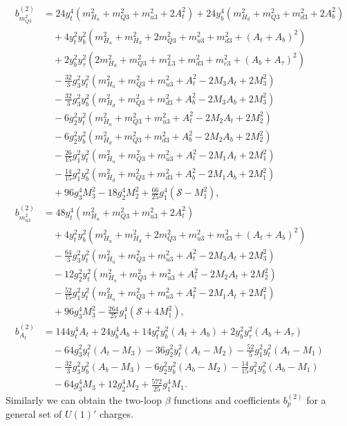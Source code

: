 \documentclass[preprint,amsmath,amssymb,aps,superscriptaddress,prd,showpacs,floatfix,nofootinbib]{revtex4-1}
\begin{document}
\begin{subequations}\label{eq:MSSMsEffPotCoeffs}
\begin{align}
b_{m_{Q3}^2}^{(2)}&=24y_t^4\left ( m_{H_u}^2+m_{Q3}^2+m_{u3}^2+2A_t^2\right )+24y_b^4\left ( m_{H_d}^2+m_{Q3}^2+m_{d3}^2+2A_b^2\right )\nonumber\\
&\quad{}+4y_t^2y_b^2\left ( m_{H_u}^2+m_{H_d}^2+2m_{Q3}^2+m_{u3}^2+m_{d3}^2+(A_t+A_b)^2\right )\nonumber\\
&\quad{}+2y_b^2y_\tau^2\left ( 2m_{H_d}^2+m_{Q3}^2+m_{L3}^2+m_{d3}^2+m_{e3}^2+(A_b+A_\tau)^2\right )\nonumber\\
&\quad{}-\frac{32}{3}g_3^2y_t^2\left ( m_{H_u}^2+m_{Q3}^2+m_{u3}^2+A_t^2-2M_3A_t+2M_3^2\right )\nonumber\\
&\quad{}-\frac{32}{3}g_3^2y_b^2\left ( m_{H_d}^2+m_{Q3}^2+m_{d3}^2+A_b^2-2M_3A_b+2M_3^2\right )\nonumber\\
&\quad{}-6g_2^2y_t^2\left ( m_{H_u}^2+m_{Q3}^2+m_{u3}^2+A_t^2-2M_2A_t+2M_2^2\right )\nonumber\\
&\quad{}-6g_2^2y_b^2\left ( m_{H_d}^2+m_{Q3}^2+m_{d3}^2+A_b^2-2M_2A_b+2M_2^2\right )\nonumber\\
&\quad{}-\frac{26}{15}g_1^2y_t^2\left ( m_{H_u}^2+m_{Q3}^2+m_{u3}^2+A_t^2-2M_1A_t+2M_1^2\right )\nonumber\\
&\quad{}-\frac{14}{15}g_1^2y_b^2\left ( m_{H_d}^2+m_{Q3}^2+m_{d3}^2+A_b^2-2M_1A_b+2M_1^2\right )\nonumber\\
&\quad{}+96g_3^4M_3^2-18g_2^4M_2^2+\frac{66}{25}g_1^4(\mathcal{S}-M_1^2),\label{eq:MSSMmQ32b2}\\
b_{m_{u3}^2}^{(2)}&=48y_t^4\left ( m_{H_u}^2+m_{Q3}^2+m_{u3}^2+2A_t^2\right )\nonumber\\
&\quad{}+4y_t^2y_b^2\left ( m_{H_u}^2+m_{H_d}^2+2m_{Q3}^2+m_{u3}^2+m_{d3}^2+(A_t+A_b)^2\right )\nonumber\\
&\quad{}-\frac{64}{3}g_3^2y_t^2\left ( m_{H_u}^2+m_{Q3}^2+m_{u3}^2+A_t^2-2M_3A_t+2M_3^2\right )\nonumber\\
&\quad{}-12g_2^2y_t^2\left ( m_{H_u}^2+m_{Q3}^2+m_{u3}^2+A_t^2-2M_2A_t+2M_2^2\right )\nonumber\\
&\quad{}-\frac{52}{15}g_1^2y_t^2\left ( m_{H_u}^2+m_{Q3}^2+m_{u3}^2+A_t^2-2M_1A_t+2M_1^2\right )\nonumber\\
&\quad{}+96g_3^4M_3^2-\frac{264}{25}g_1^4\left ( \mathcal{S}+4M_1^2\right ),\label{eq:MSSMmu32b2}\\
b_{A_t}^{(2)}&=144y_t^4A_t+24y_b^4A_b+14y_t^2y_b^2(A_t+A_b)+2y_b^2y_\tau^2(A_b+A_\tau)\nonumber\\
&\quad{}-64g_3^2y_t^2(A_t-M_3)-36g_2^2y_t^2(A_t-M_2)-\frac{52}{5}g_1^2y_t^2(A_t-M_1)\nonumber\\
&\quad{}-\frac{32}{3}g_3^2y_b^2(A_b-M_3)-6g_2^2y_b^2(A_b-M_2)-\frac{14}{15}g_1^2y_b^2(A_b-M_1)\nonumber\\
&\quad{}-64g_3^4M_3+12g_2^4M_2+\frac{572}{25}g_1^4M_1.\label{eq:MSSMAtb2}
\end{align}
\end{subequations}
Similarly we can obtain the two-loop $\beta$ functions and
coefficients $b_p^{(2)}$ for a general set of $U(1)'$
charges. 
\end{document}
